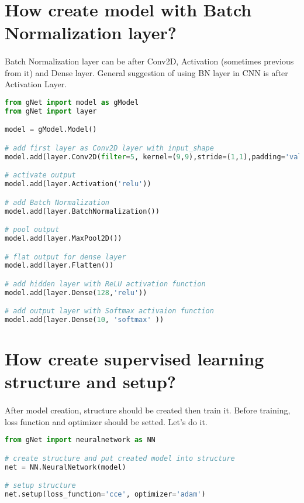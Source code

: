 \documentclass[12pt]{report}
\begin{document}
\section{How create model with Batch Normalization layer?}
\paragraph{}
Batch Normalization layer can be after Conv2D, Activation (sometimes previous from it) and Dense layer. General suggestion of using BN layer in CNN is after Activation Layer. 

\begin{lstlisting}[language=Python, numbers=none, caption={Create model with Batch Normalization.}, label={ex:create-bn-model}]
from gNet import model as gModel
from gNet import layer

model = gModel.Model()

# add first layer as Conv2D layer with input_shape
model.add(layer.Conv2D(filter=5, kernel=(9,9),stride=(1,1),padding='valid', input_shape=x_train.shape[1:], use_bias=True))

# activate output
model.add(layer.Activation('relu'))

# add Batch Normalization
model.add(layer.BatchNormalization())

# pool output
model.add(layer.MaxPool2D())

# flat output for dense layer
model.add(layer.Flatten())

# add hidden layer with ReLU activation function
model.add(layer.Dense(128,'relu'))

# add output layer with Softmax activaion function 
model.add(layer.Dense(10, 'softmax' ))

\end{lstlisting}



\section{How create supervised learning structure and setup?}
\paragraph{}
After model creation, structure should be created then train it. Before training, loss function and optimizer should be setted. Let's do it.

\begin{lstlisting}[language=Python, numbers=none, caption={Set loss function and optimizer.}, label={ex:setup}]
from gNet import neuralnetwork as NN

# create structure and put created model into structure
net = NN.NeuralNetwork(model)

# setup structure
net.setup(loss_function='cce', optimizer='adam')

\end{lstlisting}
\end{document}
